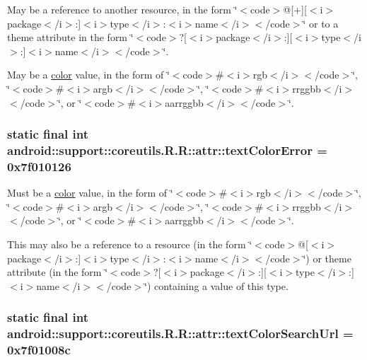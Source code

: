 May be a reference to another resource, in the form \char`\"{}$<$code$>$@\mbox{[}+\mbox{]}\mbox{[}$<$i$>$package$<$/i$>$:\mbox{]}$<$i$>$type$<$/i$>$:$<$i$>$name$<$/i$>$$<$/code$>$\char`\"{} or to a theme attribute in the form \char`\"{}$<$code$>$?\mbox{[}$<$i$>$package$<$/i$>$:\mbox{]}\mbox{[}$<$i$>$type$<$/i$>$:\mbox{]}$<$i$>$name$<$/i$>$$<$/code$>$\char`\"{}. 

May be a \hyperlink{classandroid_1_1support_1_1coreutils_1_1_r_1_1color}{color} value, in the form of \char`\"{}$<$code$>$\#$<$i$>$rgb$<$/i$>$$<$/code$>$\char`\"{}, \char`\"{}$<$code$>$\#$<$i$>$argb$<$/i$>$$<$/code$>$\char`\"{}, \char`\"{}$<$code$>$\#$<$i$>$rrggbb$<$/i$>$$<$/code$>$\char`\"{}, or \char`\"{}$<$code$>$\#$<$i$>$aarrggbb$<$/i$>$$<$/code$>$\char`\"{}. \hypertarget{classandroid_1_1support_1_1coreutils_1_1_r_1_1attr_b7012049ce26d860067749d2616fbb8f}{
\subsubsection[{textColorError}]{\setlength{\rightskip}{0pt plus 5cm}static final int android::support::coreutils.R.R::attr::textColorError = 0x7f010126}}
\label{classandroid_1_1support_1_1coreutils_1_1_r_1_1attr_b7012049ce26d860067749d2616fbb8f}


Must be a \hyperlink{classandroid_1_1support_1_1coreutils_1_1_r_1_1color}{color} value, in the form of \char`\"{}$<$code$>$\#$<$i$>$rgb$<$/i$>$$<$/code$>$\char`\"{}, \char`\"{}$<$code$>$\#$<$i$>$argb$<$/i$>$$<$/code$>$\char`\"{}, \char`\"{}$<$code$>$\#$<$i$>$rrggbb$<$/i$>$$<$/code$>$\char`\"{}, or \char`\"{}$<$code$>$\#$<$i$>$aarrggbb$<$/i$>$$<$/code$>$\char`\"{}. 

This may also be a reference to a resource (in the form \char`\"{}$<$code$>$@\mbox{[}$<$i$>$package$<$/i$>$:\mbox{]}$<$i$>$type$<$/i$>$:$<$i$>$name$<$/i$>$$<$/code$>$\char`\"{}) or theme attribute (in the form \char`\"{}$<$code$>$?\mbox{[}$<$i$>$package$<$/i$>$:\mbox{]}\mbox{[}$<$i$>$type$<$/i$>$:\mbox{]}$<$i$>$name$<$/i$>$$<$/code$>$\char`\"{}) containing a value of this type. \hypertarget{classandroid_1_1support_1_1coreutils_1_1_r_1_1attr_4bd932db06e695e8094eeb0249aa73d7}{
\subsubsection[{textColorSearchUrl}]{\setlength{\rightskip}{0pt plus 5cm}static final int android::support::coreutils.R.R::attr::textColorSearchUrl = 0x7f01008c}}
\label{classandroid_1_1support_1_1coreutils_1_1_r_1_1attr_4bd932db06e695e8094eeb0249aa73d7}


